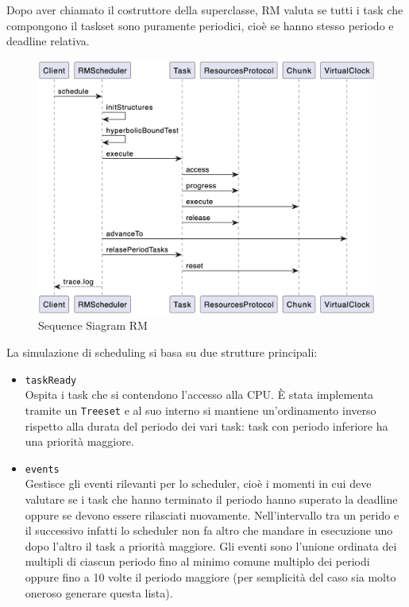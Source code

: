Dopo aver chiamato il costruttore della superclasse, RM valuta se tutti i task che compongono il taskset sono puramente periodici, cioè se hanno stesso periodo e deadline relativa.

\begin{figure}[htbp]
    \centering
    \includegraphics[width=.9\textwidth]{immagini/sequence diagram RM.pdf}
    \caption{Sequence Siagram RM}
    \label{fig:sdRM}
\end{figure}

\myskip

La simulazione di scheduling si basa su due strutture principali:
\begin{itemize}
    \item \texttt{taskReady} \\
        Ospita i task che si contendono l'accesso alla CPU. È stata implementa tramite un \texttt{Treeset} e al suo interno si mantiene un'ordinamento inverso rispetto alla durata del periodo dei vari task: task con periodo inferiore ha una priorità maggiore.
    \item \texttt{events} \\
        Gestisce gli eventi rilevanti per lo scheduler, cioè i momenti in cui deve valutare se i task che hanno terminato il periodo hanno superato la deadline oppure se devono essere rilasciati nuovamente. Nell'intervallo tra un perido e il successivo infatti lo scheduler non fa altro che mandare in esecuzione uno dopo l'altro il task a priorità maggiore. Gli eventi sono l’unione ordinata dei multipli di ciascun periodo fino al minimo comune multiplo dei periodi oppure fino a 10 volte il periodo maggiore (per semplicità del caso sia molto oneroso generare questa lista).
\end{itemize}

